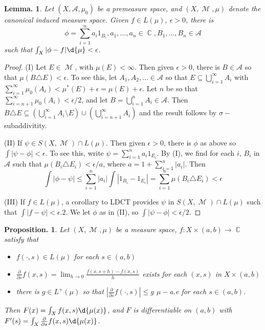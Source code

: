 \documentclass[11pt, a4paper]{memoir}
\DeclareMathOperator{\C}{{\mathbb{C}}}
\theoremstyle{change}
\newtheorem{lemma}[theorem]{Lemma.}
\newtheorem{proposition}[theorem]{Proposition.}
\theoremstyle{plain}
\theoremstyle{nonumberplain}
\newtheorem{proof}{Proof}
\DeclareMathOperator{\M}{{\mathcal{M}}}
\begin{document}
\begin{lemma}
    Let $(X,\mathcal{A},\mu_0)$ be a premeasure space, and $(X,\M,\mu)$ denote the canonical induced measure space.
    Given $f\in L(\mu)$, $\epsilon>0$, there is
    \begin{equation*}
        \phi=\sum\limits_{i=1}^n a_i1_{B_i},a_1,\ldots,a_n\in\C,B_1,\ldots,B_n\in\mathcal{A}
    \end{equation*}
    such that $\int_X|\phi-f|\d{\mu}<\epsilon$.
\end{lemma}
\begin{proof}
    (I) Let $E\in\M$, with $\mu(E)<\infty$.
    Then given $\epsilon>0$, there is $B\in\mathcal{A}$ so that $\mu(B\triangle E)<\epsilon$.
    To see this, let $A_1,A_2,\ldots\in\mathcal{A}$ so that $E\subseteq\bigcup_{i=1}^\infty A_i$ with $\sum_{i=1}^\infty \mu_0(A_i)<\mu^*(E)+\epsilon=\mu(E)+\epsilon$.
    Let $n$ be so that $\sum_{i=n+1}^\infty \mu_0(A_i)<\epsilon/2$, and let $B=\bigcup_{i=1}^n A_i\in\mathcal{A}$.
    Then $B\triangle E\subseteq\left(\bigcup_{i=1}^\infty A_i\setminus E\right)\cup\left(\bigcup_{i=n+1}^\infty A_i\right)$ and the result follows by $\sigma-$subaddivitity.

    (II) If $\psi\in S(X,\M)\cap L(\mu)$.
    Then given $\epsilon>0$, there is $\phi$ as above so $\int|\psi-\phi|<\epsilon$.
    To see this, write $\psi=\sum_{i=1}^n a_i1_{E_i}$.
    By (I), we find for each $i$, $B_i$ in $\mathcal{A}$ such that $\mu(B_i\triangle E_i)<\epsilon/a$, where $a=1+\sum_{i=1}^n|a_i|$.
    Then
    \begin{equation*}
        \int|\phi-\psi|\leq\sum_{i=1}^n|a_i|\int|1_{B_i}-1_{E_i}|=\sum_{i=1}^n \mu(B_i\triangle E_i)<\epsilon
    \end{equation*}

    (III) If $f\in L(\mu)$, a corollary to LDCT provides $\psi$ in $S(X,\M)\cap L(\mu)$ such that $\int|f-\psi|<\epsilon.2$.
    We let $\phi$ as in (II), so $\int|\psi-\phi|<\epsilon/2$.
\end{proof}
\begin{proposition}
    Let $(X,\M,\mu)$ be a measure space, $f:X\times(a,b)\to\C$ satisfy that
    \begin{itemize}[nolistsep]
        \item $f(\cdot,s)\in L(\mu)$ for each $s\in(a,b)$
        \item $\frac{\partial}{\partial s}f(x,s)=\lim_{h\to 0}\frac{f(x,s+h)-f(x,s)}{h}$ exists for each $(x,s)$ in $X\times(a,b)$
        \item there is $g\in L^+(\mu)$ so that $\left\lvert\frac{\partial}{\partial s}f(\cdot,s)\right\rvert\leq g$ $\mu-$a.e for each $s\in(a,b)$.
    \end{itemize}
    Then $F(x)=\int_X f(x,s)\d{\mu(x)}$, and $F$ is differentiable on $(a,b)$ with $F'(s)=\int_X\frac{\partial}{\partial s}f(x,s)\d{\mu(x)}$.
\end{proposition}
\end{document}
